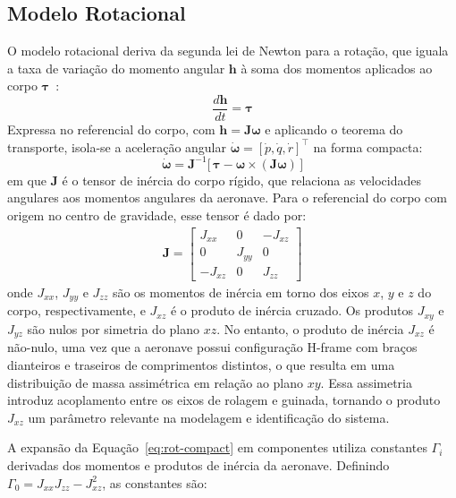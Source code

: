 \documentclass{ieeeaccess}
\begin{document}
\subsection{Modelo Rotacional}

O modelo rotacional deriva da segunda lei de Newton para a rotação, que iguala a taxa de variação do momento angular $\mathbf{h}$ à soma dos momentos aplicados ao corpo $\boldsymbol{\tau}$~\cite{cBeard}:
\begin{equation}
\frac{d\mathbf{h}}{dt} = \boldsymbol{\tau}
\label{eq:rot-newton}
\end{equation}
Expressa no referencial do corpo, com $\mathbf{h} = \mathbf{J}\boldsymbol{\omega}$ e aplicando o teorema do transporte, isola-se a aceleração angular $\dot{\boldsymbol{\omega}} = [\dot{p}, \dot{q}, \dot{r}]^{\top}$ na forma compacta:
\begin{equation}
\dot{\boldsymbol{\omega}} = \mathbf{J}^{-1}\big[\,\boldsymbol{\tau} - \boldsymbol{\omega} \times (\mathbf{J}\boldsymbol{\omega})\,\big]
\label{eq:rot-compact}
\end{equation}
em que $\mathbf{J}$ é o tensor de inércia do corpo rígido, que relaciona as velocidades angulares aos momentos angulares da aeronave. Para o referencial do corpo com origem no centro de gravidade, esse tensor é dado por:
\begin{align}
\mathbf{J} = \begin{bmatrix}
J_{xx} & 0 & -J_{xz} \\
0 & J_{yy} & 0 \\
-J_{xz} & 0 & J_{zz}
\end{bmatrix}
\end{align}
onde $J_{xx}$, $J_{yy}$ e $J_{zz}$ são os momentos de inércia em torno dos eixos $x$, $y$ e $z$ do corpo, respectivamente, e $J_{xz}$ é o produto de inércia cruzado. Os produtos $J_{xy}$ e $J_{yz}$ são nulos por simetria do plano $xz$. No entanto, o produto de inércia $J_{xz}$ é não-nulo, uma vez que a aeronave possui configuração H-frame com braços dianteiros e traseiros de comprimentos distintos, o que resulta em uma distribuição de massa assimétrica em relação ao plano $xy$. Essa assimetria introduz acoplamento entre os eixos de rolagem e guinada, tornando o produto $J_{xz}$ um parâmetro relevante na modelagem e identificação do sistema.

A expansão da Equação~\eqref{eq:rot-compact} em componentes utiliza constantes $\Gamma_i$ derivadas dos momentos e produtos de inércia da aeronave. Definindo $\Gamma_0 = J_{xx} J_{zz} - J_{xz}^2$, as constantes são:
\end{document}
